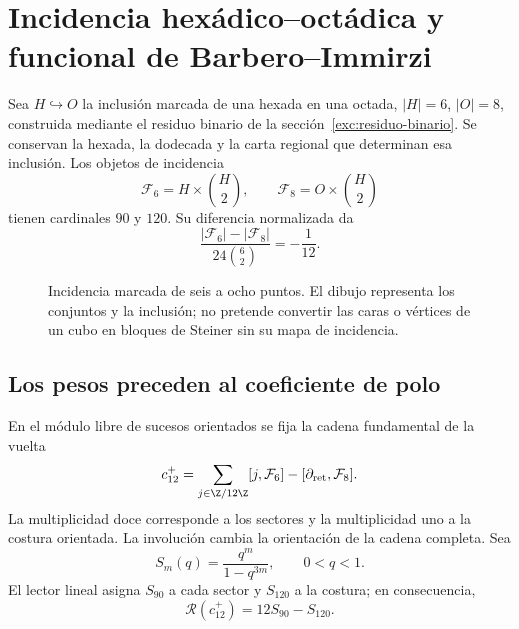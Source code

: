 \section{Incidencia hexádico--octádica y funcional de Barbero--Immirzi}
\label{v:ant:sec:barbero}
Sea $H\hookrightarrow O$ la inclusión marcada de una hexada en una octada,
$|H|=6$, $|O|=8$, construida mediante el residuo binario de la
sección~\ref{exc:residuo-binario}. Se conservan la hexada, la dodecada
y la carta regional que determinan esa inclusión.
Los objetos de incidencia
\[
\mathcal F_6=H\times\binom H2,\qquad
\mathcal F_8=O\times\binom H2
\]
tienen cardinales $90$ y $120$. Su diferencia normalizada da
\[
\frac{|\mathcal F_6|-|\mathcal F_8|}{24\binom62}=-\frac1{12}.
\]
\begin{figure}[htbp]
\centering
{}
\caption{Incidencia marcada de seis a ocho puntos. El dibujo representa
los conjuntos y la inclusión; no pretende convertir las caras o vértices
de un cubo en bloques de Steiner sin su mapa de incidencia.}
\end{figure}

\subsection{Los pesos preceden al coeficiente de polo}
En el módulo libre de sucesos orientados se fija la cadena
fundamental de la vuelta
\[
c_{12}^{+}=
\sum_{j\in\Z/12\Z}[j,\mathcal F_6]
-[\partial_{\rm ret},\mathcal F_8].
\]
La multiplicidad doce corresponde a los sectores y la multiplicidad uno
a la costura orientada. La involución cambia la orientación de la cadena
completa. Sea
\[
S_m(q)=\frac{q^m}{1-q^{3m}},\qquad 0<q<1.
\]
El lector lineal asigna $S_{90}$ a cada sector y $S_{120}$ a la costura;
en consecuencia,
\[
\mathscr R(c_{12}^{+})=12S_{90}-S_{120}.
\]

